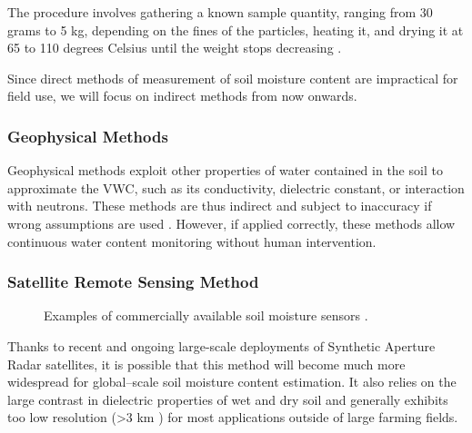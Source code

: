 The procedure involves gathering a known sample quantity, ranging from 30 grams to 5 kg, depending on the fines of the particles, heating it, and drying it at 65 to 110 degrees Celsius until the weight stops decreasing \cite{department_of_sustainable_natural_resources_soil_2024,myjove_corporation_determination_2024, paul_soil_2007}.

Since direct methods of measurement of soil moisture content are impractical for field use, we will focus on indirect methods from now onwards.

\subsubsection{Geophysical Methods}
Geophysical methods exploit other properties of water contained in the soil to approximate the VWC, such as its conductivity, dielectric constant, or interaction with neutrons. These methods are thus indirect and subject to inaccuracy if wrong assumptions are used \cite{webster_humidity_1998}. However, if applied correctly, these methods allow continuous water content monitoring without human intervention.

\subsubsection{Satellite Remote Sensing Method}
\begin{figure}
    \hfil
    \caption{\label{fig:satellite}Examples of commercially available soil moisture sensors \cite{meter_group_teros_nodate, baseline_soil_2021, czechproject_spol_sro_pudni_2024}.}
\end{figure}
Thanks to recent and ongoing large-scale deployments of Synthetic Aperture Radar satellites, it is possible that this method will become much more widespread for global--scale soil moisture content estimation. It also relies on the large contrast in dielectric properties of wet and dry soil and generally exhibits too low resolution (>3 km \cite{podest_applications_nodate,eos_data_analytics_remote_2022}) for most applications outside of large farming fields.

